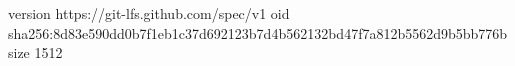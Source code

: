 version https://git-lfs.github.com/spec/v1
oid sha256:8d83e590dd0b7f1eb1c37d692123b7d4b562132bd47f7a812b5562d9b5bb776b
size 1512
